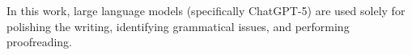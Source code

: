In this work, large language models (specifically ChatGPT-5) are used solely for polishing the writing, identifying grammatical issues, and performing proofreading.







